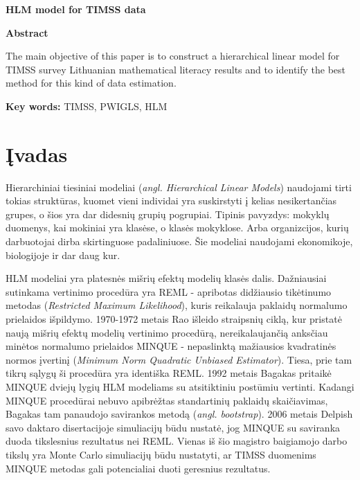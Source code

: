 \documentclass[12pt,a4paper]{article}
\begin{document}
\begin{center}{\large\textbf{HLM model for TIMSS data}}\end{center}

\begin{small}
\vspace{2\baselineskip}
\begin{center}\textbf{Abstract}\end{center}

\indent The main objective of this paper is to construct a hierarchical linear model for TIMSS survey Lithuanian mathematical literacy results and to identify the best method for this kind of data estimation.

\vspace{\baselineskip}

\noindent\textbf{Key words:}
TIMSS, PWIGLS, HLM
\end{small}
\vspace{\baselineskip}

\newpage
\section{Įvadas}

\indent Hierarchiniai tiesiniai modeliai (\textit{angl. Hierarchical Linear Models}) naudojami tirti tokias struktūras, kuomet vieni individai yra suskirstyti į kelias nesikertančias grupes, o šios yra dar didesnių grupių pogrupiai. Tipinis pavyzdys: mokyklų duomenys, kai mokiniai yra klasėse, o klasės mokyklose. Arba organizcijos, kurių darbuotojai dirba skirtinguose padaliniuose. Šie modeliai naudojami ekonomikoje, biologijoje ir dar daug kur.

\indent HLM modeliai yra platesnės mišrių efektų modelių klasės dalis. Dažniausiai sutinkama vertinimo procedūra yra REML - apribotas didžiausio tikėtinumo metodas (\textit{Restricted Maximum Likelihood}), kuris reikalauja paklaidų normalumo prielaidos išpildymo. 1970-1972 metais Rao išleido straipsnių ciklą, kur pristatė naują mišrių efektų modelių vertinimo procedūrą, nereikalaujančią anksčiau minėtos normalumo prielaidos MINQUE - nepaslinktą mažiausios kvadratinės normos įvertinį (\textit{Minimum Norm Quadratic Unbiased Estimator}). Tiesa, prie tam tikrų sąlygų ši procedūra yra identiška REML. 1992 metais Bagakas pritaikė MINQUE dviejų lygių HLM modeliams su atsitiktiniu postūmiu vertinti. Kadangi MINQUE procedūrai nebuvo apibrėžtas standartinių paklaidų skaičiavimas, Bagakas tam panaudojo savirankos metodą (\textit{angl. bootstrap}). 2006 metais Delpish savo daktaro disertacijoje simuliacijų būdu nustatė, jog MINQUE su saviranka duoda tikslesnius rezultatus nei REML. Vienas iš šio magistro baigiamojo darbo tikslų yra Monte Carlo simuliacijų būdu nustatyti, ar TIMSS duomenims MINQUE metodas gali potencialiai duoti geresnius rezultatus.
\end{document}
